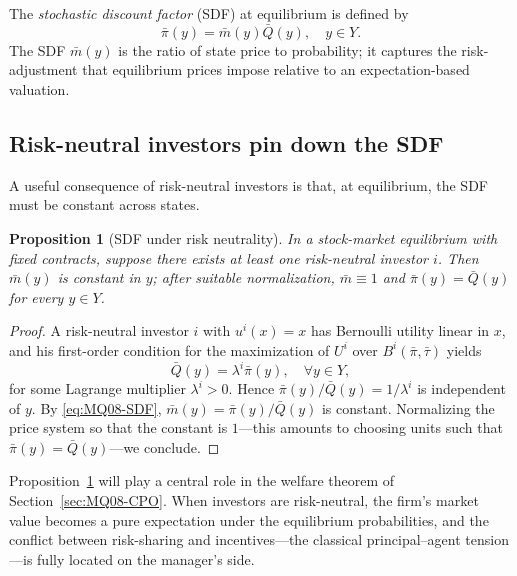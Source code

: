 \documentclass[11pt,a4paper,oneside]{book}
\theoremstyle{plain}
\newtheorem{proposition}[theorem]{Proposition}
\theoremstyle{definition}
\theoremstyle{remark}
\numberwithin{equation}{chapter}
\begin{document}
The \emph{stochastic discount factor} (SDF) at equilibrium is defined by
\begin{equation}\label{eq:MQ08-SDF}
  \bar{\pi}(y) = \bar{m}(y) \bar{Q}(y), \quad y \in Y.
\end{equation}
The SDF $\bar{m}(y)$ is the ratio of state price to probability; it captures the risk-adjustment that equilibrium prices impose relative to an expectation-based valuation.

\subsection{Risk-neutral investors pin down the SDF}

A useful consequence of risk-neutral investors is that, at equilibrium, the SDF must be constant across states.

\begin{proposition}[SDF under risk neutrality]\label{prop:SDF-risk-neutral}
In a stock-market equilibrium with fixed contracts, suppose there exists at least one risk-neutral investor $i$.
Then $\bar{m}(y)$ is constant in $y$; after suitable normalization, $\bar{m} \equiv 1$ and $\bar{\pi}(y) = \bar{Q}(y)$ for every $y \in Y$.
\end{proposition}

\begin{proof}
A risk-neutral investor $i$ with $u^i(x) = x$ has Bernoulli utility linear in $x$, and his first-order condition for the maximization of $U^i$ over $B^i(\bar{\pi}, \bar{\tau})$ yields
\begin{equation*}
  \bar{Q}(y) = \lambda^i \bar{\pi}(y), \quad \forall y \in Y,
\end{equation*}
for some Lagrange multiplier $\lambda^i > 0$.
Hence $\bar{\pi}(y) / \bar{Q}(y) = 1 / \lambda^i$ is independent of $y$.
By \eqref{eq:MQ08-SDF}, $\bar{m}(y) = \bar{\pi}(y) / \bar{Q}(y)$ is constant.
Normalizing the price system so that the constant is $1$---this amounts to choosing units such that $\bar{\pi}(y) = \bar{Q}(y)$---we conclude.
\end{proof}

Proposition~\ref{prop:SDF-risk-neutral} will play a central role in the welfare theorem of Section~\ref{sec:MQ08-CPO}.
When investors are risk-neutral, the firm's market value becomes a pure expectation under the equilibrium probabilities, and the conflict between risk-sharing and incentives---the classical principal--agent tension---is fully located on the manager's side.
\end{document}
